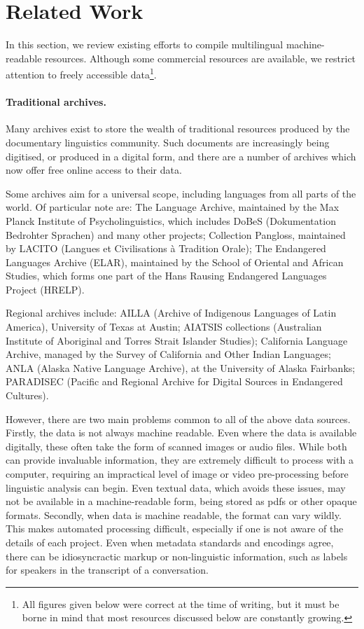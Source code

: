 \section{Related Work} \label{sec:related}

In this section, we review existing efforts to compile multilingual machine-readable resources.  Although some commercial resources are available, we restrict attention to freely accessible data\footnote{All figures given below were correct at the time of writing, but it must be borne in mind that most resources discussed below are constantly growing.}.

\paragraph{Traditional archives.}
Many archives exist to store the wealth of traditional resources produced by the documentary linguistics community.  Such documents are increasingly being digitised, or produced in a digital form, and there are a number of archives which now offer free online access to their data.

Some archives aim for a universal scope, including languages from all parts of the world.  Of particular note are: The Language Archive, maintained by the Max Planck Institute of Psycholinguistics, which includes DoBeS (Dokumentation Bedrohter Sprachen) and many other projects;
Collection Pangloss, maintained by LACITO (Langues et Civilisations à Tradition Orale);
The Endangered Languages Archive (ELAR), maintained by the School of Oriental and African Studies, which forms one part of the Hans Rausing Endangered Languages Project (HRELP).

Regional archives include: AILLA (Archive of Indigenous Languages of Latin America), University of Texas at Austin;
AIATSIS collections (Australian Institute of Aboriginal and Torres Strait Islander Studies);
California Language Archive, managed by the Survey of California and Other Indian Languages;
ANLA (Alaska Native Language Archive), at the University of Alaska Fairbanks;
PARADISEC (Pacific and Regional Archive for Digital Sources in Endangered Cultures).

However, there are two main problems common to all of the above data sources.  Firstly, the data is not always machine readable.  Even where the data is available digitally, these often take the form of scanned images or audio files.  While both can provide invaluable information, they are extremely difficult to process with a computer, requiring an impractical level of image or video pre-processing before linguistic analysis can begin.  Even textual data, which avoids these issues, may not be available in a machine-readable form, being stored as pdfs or other opaque formats.
Secondly, when data is machine readable, the format can vary wildly.  This makes automated processing difficult, especially if one is not aware of the details of each project.  Even when metadata standards and encodings agree, there can be idiosyncractic markup or non-linguistic information, such as labels for speakers in the transcript of a conversation.

